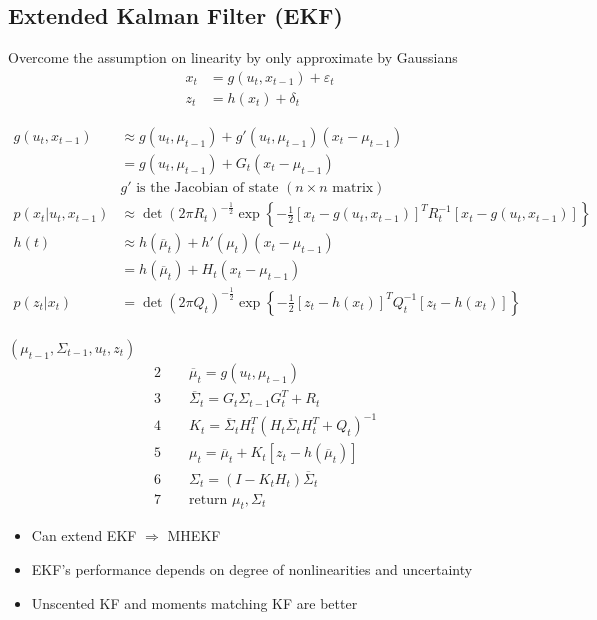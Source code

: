 \subsection{Extended Kalman Filter (EKF)}
Overcome the assumption on linearity by only approximate by Gaussians
\begin{align*}
	x_t &= g(u_t, x_{t-1}) + \varepsilon_t\\
	z_t &= h(x_t) + \delta_t
\end{align*}

\begin{align*}
	g(u_t, x_{t-1}) &\approx g(u_t, \mu_{t-1}) + g'(u_t, \mu_{t-1}) (x_t - \mu_{t-1}) \\
	&= g(u_t, \mu_{t-1}) + G_t(x_t - \mu_{t-1})\\
	& g' \text{ is the Jacobian of state } (n\times n \text{ matrix})\\
	p(x_t | u_t, x_{t-1}) &\approx \det \left( 2\pi R_t \right)^{-\frac{1}{2}} \exp \left\{-\frac{1}{2} [x_t - g(u_t, x_{t-1})] ^T R_t^{-1} [x_t - g(u_t, x_{t-1})] \right\} \\
	h(t) &\approx h(\overline{\mu}_t) + h'(\mu_t) (x_t - \mu_{t-1})\\
	&= h(\overline{\mu}_t) + H_t (x_t - \mu_{t-1})\\
	p(z_t | x_t) &= \det \left( 2\pi Q_t \right)^{-\frac{1}{2}} \exp \left\{-\frac{1}{2} [z_t - h(x_t)] ^T Q_t^{-1} [z_t - h(x_t)]\right\} \\
\end{align*}

 $(\mu_{t-1}, \Sigma_{t-1}, u_t, z_t)$
\begin{align*}
	&2 \qquad \overline{\mu}_t = g(u_t, \mu_{t-1})\\
	&3 \qquad \overline{\Sigma}_t = G_t \Sigma_{t-1} G_t^T + R_t\\
	&4 \qquad K_t = \overline{\Sigma}_t H_t^T \left( H_t \overline{\Sigma}_t H_t^T + Q_t \right)^{-1} \\
	&5 \qquad \mu_t = \overline{\mu}_t + K_t [z_t - h(\overline{\mu}_t)]\\
	&6 \qquad \Sigma_t = (I - K_t H_t) \overline{\Sigma}_t\\
	&7 \qquad \text{return } \mu_t, \Sigma_t
\end{align*}

\begin{itemize}
	\item Can extend \ac{EKF} $\Rightarrow$ \ac{MHEKF}
	\item \ac{EKF}'s performance depends on degree of nonlinearities and uncertainty
	\item Unscented \ac{KF} and moments matching \ac{KF} are better
\end{itemize}

